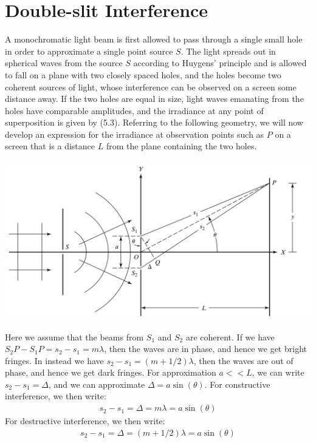 \documentclass[11pt]{book}
\theoremstyle{break}
\theoremstyle{break}
\begin{document}
\newpage
\section[Double-slit Interference]{\color{red}Double-slit Interference\color{black}}
A monochromatic light beam is first allowed to pass through a single small hole in order to approximate a single point source $S$. The light spreads out in spherical waves from the source $S$ according to Huygens' principle and is allowed to fall on a plane with two closely spaced holes, and the holes become two coherent sources of light, whose interference can be observed on a screen some distance away. If the two holes are equal in size, light waves emanating from the holes have comparable amplitudes, and the irradiance at any point of superposition is given by (5.3). Referring to the following geometry, we will now develop an expression for the irradiance at observation points such as $P$ on a screen that is a distance $L$ from the plane containing the two holes.
\begin{center}
\includegraphics[scale=0.45]{doubleSlit.png}
\end{center}
Here we assume that the beams from $S_1$ and $S_2$ are coherent. If we have $S_2P - S_1 P = s_2 - s_1 = m\lambda$, then the waves are in phase, and hence we get bright fringes. In instead we have $s_2 - s_1 = (m+1/2) \lambda$, then the waves are out of phase, and hence we get dark fringes. For approximation $a<<L$, we can write $s_2 - s_1 = \Delta$, and we can approximate $\Delta = a\sin(\theta)$. For constructive interference, we then write:
\begin{align*}
s_2 -s_1 = \Delta  = m \lambda  = a\sin(\theta)
\end{align*}
For destructive interference, we then write:
\begin{align*}
s_2 - s_1 =\Delta  = (m+1/2) \lambda = a\sin(\theta)
\end{align*}
\end{document}
